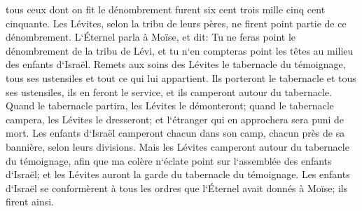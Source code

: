 \verse tous ceux dont on fit le dénombrement furent six cent trois mille cinq cent cinquante. 
\verse Les Lévites, selon la tribu de leurs pères, ne firent point partie de ce dénombrement. 
\verse L`Éternel parla à Moïse, et dit: 
\verse Tu ne feras point le dénombrement de la tribu de Lévi, et tu n`en compteras point les têtes au milieu des enfants d`Israël. 
\verse Remets aux soins des Lévites le tabernacle du témoignage, tous ses ustensiles et tout ce qui lui appartient. Ils porteront le tabernacle et tous ses ustensiles, ils en feront le service, et ils camperont autour du tabernacle. 
\verse Quand le tabernacle partira, les Lévites le démonteront; quand le tabernacle campera, les Lévites le dresseront; et l`étranger qui en approchera sera puni de mort. 
\verse Les enfants d`Israël camperont chacun dans son camp, chacun près de sa bannière, selon leurs divisions. 
\verse Mais les Lévites camperont autour du tabernacle du témoignage, afin que ma colère n`éclate point sur l`assemblée des enfants d`Israël; et les Lévites auront la garde du tabernacle du témoignage. 
\verse Les enfants d`Israël se conformèrent à tous les ordres que l`Éternel avait donnés à Moïse; ils firent ainsi. 

\chapter{}

